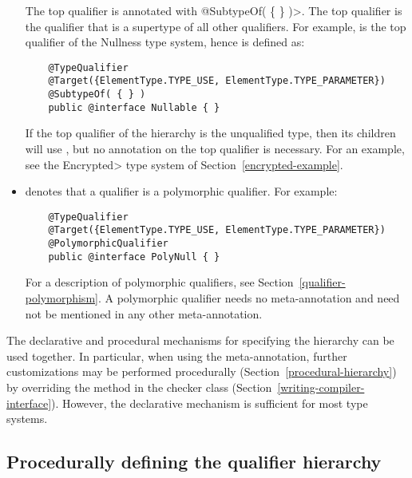 \begin{itemize}
  The top qualifier is annotated with
  \<@SubtypeOf( \{ \} )>.  The top qualifier is the qualifier that is
  a supertype of all other qualifiers.  For example, 
  is the top qualifier of the Nullness type system, hence is defined as:

  \begin{Verbatim}
    @TypeQualifier
    @Target({ElementType.TYPE_USE, ElementType.TYPE_PARAMETER})
    @SubtypeOf( { } )
    public @interface Nullable { }
  \end{Verbatim}

  If the top qualifier of the hierarchy is the unqualified type, then its children
  will use , but no  annotation on the top qualifier is necessary.  For an example, see the
  \<Encrypted> type system of Section~\ref{encrypted-example}.

\item {} denotes that a qualifier is a
  polymorphic qualifier.  For example:

  \begin{Verbatim}
    @TypeQualifier
    @Target({ElementType.TYPE_USE, ElementType.TYPE_PARAMETER})
    @PolymorphicQualifier
    public @interface PolyNull { }
  \end{Verbatim}

  For a description of polymorphic qualifiers, see
  Section~\ref{qualifier-polymorphism}.  A polymorphic qualifier needs
  no  meta-annotation and need not be
  mentioned in any other 
  meta-annotation.

\end{itemize}

The declarative and procedural mechanisms for specifying the hierarchy can
be used together.  In particular, when using the 
meta-annotation, further customizations may be
performed procedurally (Section~\ref{procedural-hierarchy})
by overriding the  method in the checker class
(Section~\ref{writing-compiler-interface}).
However, the declarative mechanism is sufficient for most type systems.


\subsection{Procedurally defining the qualifier hierarchy\label{procedural-hierarchy}}

